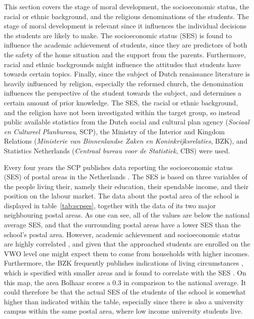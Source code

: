 This section covers the stage of moral development, the socioeconomic status, the racial or ethnic background, and the religious denominations of the students. The stage of moral development is relevant since it influences the individual decisions the students are likely to make. The socioeconomic status (SES) is found to influence the academic achievement of students, since they are predictors of both the safety of the home situation and the support from the parents. Furthermore, racial and ethnic backgrounds might influence the attitudes that students have towards certain topics. Finally, since the subject of Dutch renaissance literature is heavily influenced by religion, especially the reformed church, the denomination influences the perspective of the student towards the subject, and determines a certain amount of prior knowledge. The SES, the racial or ethnic background, and the religion have not been investigated within the target group, so instead public available statistics from the Dutch social and cultural plan agency (\emph{Sociaal en Cultureel Planbureau}, SCP), the Ministry of the Interior and Kingdom Relations (\emph{Ministerie van Binnenlandse Zaken en Koninkrijksrelaties}, BZK),  and Statistics Netherlands (\emph{Centraal bureau voor de Statistiek}, CBS) were used.



Every four years the SCP publishes data reporting the socioeconomic status (SES) of postal areas in the Netherlands \cite{scp}. The SES is based on three variables of the people living their, namely their education, their spendable income, and their position on the labour market. The data about the postal area of the school is displayed in table~\ref{tab:scpses}, together with the data of its two major neighbouring postal areas. As one can see, all of the values are below the national average SES, and that the surrounding postal areas have a lower SES than the school's postal area. However, academic achievement and socioeconomic status are highly correlated \cite{academicsocioeconomic}, and given that the approached students are enrolled on the VWO level one might expect them to come from households with higher incomes. Furthermore, the BZK frequently publishes indications of living circumstances \cite{bzk}, which is specified with smaller areas and is found to correlate with the SES \cite{knol}. On this map, the area Bolhaar scores a 0.3 in comparison to the national average. It could therefore be that the actual SES of the students of the school is somewhat higher than indicated within the table, especially since there is also a university campus within the same postal area, where low income university students live.

